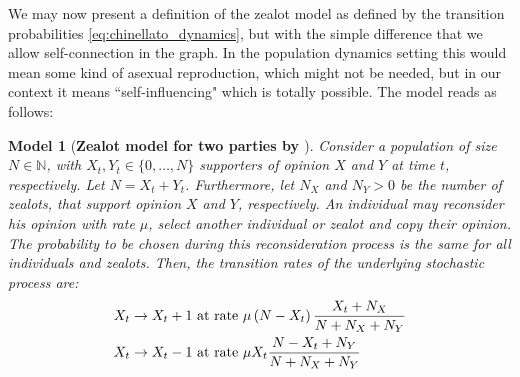 \documentclass[12pt,a4paper,twoside]{article}
\newtheorem{model}{Model}[section]
\begin{document}
We may now present a definition of the zealot model as defined by the transition probabilities \eqref{eq:chinellato_dynamics}, but with the simple difference that we allow self-connection in the graph. In the population dynamics setting this would mean some kind of asexual reproduction, which might not be needed, but in our context it means ``self-influencing" which is totally possible. The model reads as follows:
\begin{model}[\textbf{Zealot model for two parties by \cite{Aguiar2011, Chinellato2015, Braha2017}}]\label{model:zealot}
Consider a population of size $N \in \mathbb{N}$, with $X_t, Y_t \in \lbrace 0,\dots,N\rbrace$ supporters of opinion $X$ and $Y$ at time $t$, respectively. Let $N = X_t + Y_t$. Furthermore, let $N_X$ and $N_Y > 0$ be the number of zealots, that support opinion $X$ and $Y$, respectively. An individual may reconsider his opinion with rate $\mu$, select another individual or zealot and copy their opinion. The probability to be chosen during this reconsideration process is the same for all individuals and zealots. Then, the transition rates of the underlying stochastic process are:
\begin{align}\label{def:transition_rates_zealot}
	\begin{split}
	X_t \rightarrow X_t + 1 & \textnormal{ at rate } \mu\left(N-X_t\right)\frac{X_t + N_X}{N + N_X + N_Y} \\
	X_t \rightarrow X_t - 1 & \textnormal{ at rate } \mu X_t\frac{N-X_t+N_Y}{N+N_X+N_Y}
	\end{split}
\end{align}
\end{model}
\end{document}
